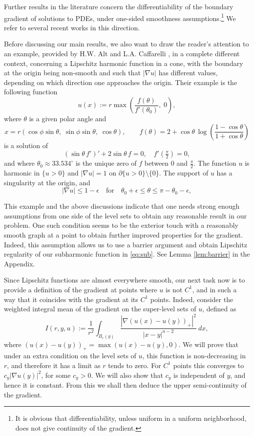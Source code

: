 \documentclass[11pt,reqno]{amsart}
\theoremstyle{plain}
\theoremstyle{remark}
\numberwithin{equation}{section}
\begin{document}
Further results in the literature concern the differentiability of  the boundary gradient of solutions to PDEs, under one-sided smoothness assumptions.\footnote{It is obvious that differentiability, unless uniform in a uniform neighborhood, does not give continuity of the gradient.}
We refer to several recent works in this direction\cite{HLW2014, HLZ2016, HLW2020}. 



Before discussing our main results, we also want to draw the reader's attention to an example, provided by 
H.W. Alt and L.A. Caffarelli \cite[Example 2.7]{Alt-Caff}, in a complete different context,  concerning a  Lipschitz harmonic function  in a cone, with the boundary at the  origin being non-smooth and such that $|\nabla u|$ has different values, depending on which direction one approaches the origin. Their example is the following function 
\[
u(x) := r \max\left( \frac{f(\theta)}{f'(\theta_0)}, \; 0 \right),
\]
where $\theta$ is a  given  polar  angle  and 
\[
x = r(\cos \phi \sin \theta, \; \sin \phi \sin \theta, \; \cos \theta), \qquad 
f(\theta) = 2 + \cos \theta \, \log \left( \frac{1 - \cos \theta}{1 + \cos \theta} \right)
\]
is a solution of
\[
(\sin \theta \, f')' + 2 \sin \theta \, f = 0, 
\quad f'\!\left(\tfrac{\pi}{2}\right) = 0,
\]
and where $\theta_0 \approx 33.534^\circ$ is the unique zero of $f$ between $0$ and $\tfrac{\pi}{2}$. 
The function $u$ is harmonic in $\{u>0\}$ and $|\nabla u | = 1$ on $\partial\{u>0\}\setminus\{0\}$. 
The support of $u$ has a singularity at the origin, and 
\[
|\nabla u| \leq 1 - \epsilon 
\quad \text{for} \quad 
\theta_0 + \epsilon \leq \theta \leq \pi - \theta_0 - \epsilon,
\]


This example and the above discussions  indicate that one needs strong enough assumptions from one side of the level sets to obtain any reasonable result in our problem. One such condition seems to be the exterior touch with a reasonably smooth graph at a point to obtain further improved properties for the gradient. Indeed, this assumption allows us to use a barrier argument and obtain Lipschitz regularity of our subharmonic function in \eqref{eq:sub}. See Lemma \ref{lem:barrier} in the Appendix.



Since Lipschitz functions are almost everywhere smooth, 
our next task now  is to provide a definition of the gradient at   points where $u$ is not $C^1$, and in such a way that it coincides with the gradient at its  $C^1$ points.
Indeed, consider the  weighted  integral  mean of the gradient on the super-level sets of $u$, defined as 
\begin{equation}\label{eq:monot0}
I(r, y, u) := \frac{1}{r^2} \int_{B_r(y)} \frac{|\nabla (u(x) -u(y))_+|^2}{|x - y|^{n-2}} \ dx,
\end{equation}
where $(u(x) -u(y))_+ = \max (u(x) -u(y), 0)$. We will  prove that under an extra condition on the level sets of $u$, this function is  non-decreasing in $r$, and therefore it has a limit as $r$ tends to zero. For $C^1$ points this converges to $c_y |\nabla u(y)|^2$, for some $c_y >0$. We will also show  that $c_y$ is independent of $y$, and hence it is constant.
From this we shall then deduce the upper semi-continuity of the gradient.
\end{document}
